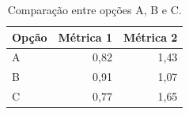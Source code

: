 
\begin{table}[h]
  \centering
  \caption{Comparação entre opções A, B e C.}
  \label{tab:exemplo}
  \begin{tabular}{lrr}
    \toprule
    \textbf{Opção} & \textbf{Métrica 1} & \textbf{Métrica 2} \\
    \midrule
    A & 0{,}82 & 1{,}43 \\
    B & 0{,}91 & 1{,}07 \\
    C & 0{,}77 & 1{,}65 \\
    \bottomrule
  \end{tabular}
\end{table}
